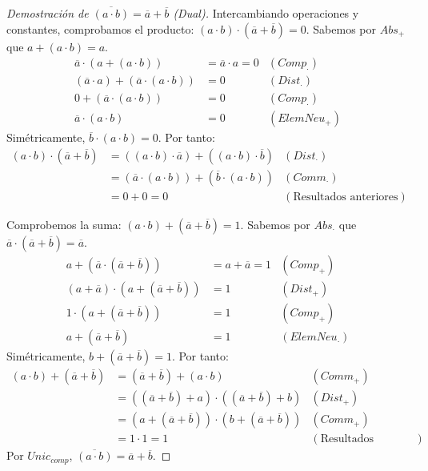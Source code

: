{\begin{proof}[Demostración de $\overline{(a \cdot b)} = \overline{a} + \overline{b}$ (Dual)]
Intercambiando operaciones y constantes, comprobamos el producto: $(a \cdot b) \cdot (\overline{a} + \overline{b}) = 0$.
Sabemos por $Abs_+$ que $a + (a \cdot b) = a$.
\begin{align*}
    \overline{a} \cdot (a + (a \cdot b)) &= \overline{a} \cdot a = 0 & (Comp_\cdot) \\
    (\overline{a} \cdot a) + (\overline{a} \cdot (a \cdot b)) &= 0 & (Dist_\cdot) \\
    0 + (\overline{a} \cdot (a \cdot b)) &= 0 & (Comp_\cdot) \\
    \overline{a} \cdot (a \cdot b) &= 0 & (ElemNeu_+)
\end{align*}
Simétricamente, $\overline{b} \cdot (a \cdot b) = 0$.
Por tanto:
\begin{align*}
    (a \cdot b) \cdot (\overline{a} + \overline{b}) &= ((a \cdot b) \cdot \overline{a}) + ((a \cdot b) \cdot \overline{b}) & (Dist_\cdot) \\
    &= (\overline{a} \cdot (a \cdot b)) + (\overline{b} \cdot (a \cdot b)) & (Comm_\cdot) \\
    &= 0 + 0 = 0 & (\text{Resultados anteriores})
\end{align*}

Comprobemos la suma: $(a \cdot b) + (\overline{a} + \overline{b}) = 1$.
Sabemos por $Abs_\cdot$ que $\overline{a} \cdot (\overline{a} + \overline{b}) = \overline{a}$.
\begin{align*}
    a + (\overline{a} \cdot (\overline{a} + \overline{b})) &= a + \overline{a} = 1 & (Comp_+) \\
    (a + \overline{a}) \cdot (a + (\overline{a} + \overline{b})) &= 1 & (Dist_+) \\
    1 \cdot (a + (\overline{a} + \overline{b})) &= 1 & (Comp_+) \\
    a + (\overline{a} + \overline{b}) &= 1 & (ElemNeu_\cdot)
\end{align*}
Simétricamente, $b + (\overline{a} + \overline{b}) = 1$.
Por tanto:
\begin{align*}
    (a \cdot b) + (\overline{a} + \overline{b}) &= (\overline{a} + \overline{b}) + (a \cdot b) & (Comm_+) \\
    &= ((\overline{a} + \overline{b}) + a) \cdot ((\overline{a} + \overline{b}) + b) & (Dist_+) \\
    &= (a + (\overline{a} + \overline{b})) \cdot (b + (\overline{a} + \overline{b})) & (Comm_+) \\
    &= 1 \cdot 1 = 1 & (\text{Resultados anteriores})
\end{align*}
Por $Unic_{comp}$, $\overline{(a \cdot b)} = \overline{a} + \overline{b}$.
\end{proof}

}
